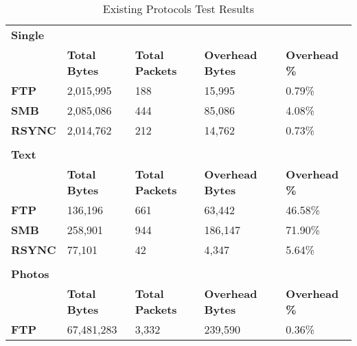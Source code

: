 \begin{table}[h!]
	\caption{Existing Protocols Test Results}
	\label{tab:existing-protocols-test-results}
	\centering
	\begin{tabular}{l l l l l}
		\textbf{Single}     &                      &                        &                         &                      \\
		\textbf{}           & \textbf{Total Bytes} & \textbf{Total Packets} & \textbf{Overhead Bytes} & \textbf{Overhead \%} \\
		\hline
		\textbf{FTP}        & 2,015,995            & 188                    & 15,995                  & 0.79\%               \\
		\hline
		\textbf{SMB}        & 2,085,086            & 444                    & 85,086                  & 4.08\%               \\
		\hline
		\textbf{RSYNC}      & 2,014,762            & 212                    & 14,762                  & 0.73\%               \\
		\hline
		                    &                      &                        &                         &                      \\
		\textbf{Text}       &                      &                        &                         &                      \\
		\textbf{}           & \textbf{Total Bytes} & \textbf{Total Packets} & \textbf{Overhead Bytes} & \textbf{Overhead \%} \\
		\hline
		\textbf{FTP}        & 136,196              & 661                    & 63,442                  & 46.58\%              \\
		\hline
		\textbf{SMB}        & 258,901              & 944                    & 186,147                 & 71.90\%              \\
		\hline
		\textbf{RSYNC}      & 77,101               & 42                     & 4,347                   & 5.64\%               \\
		\hline
		                    &                      &                        &                         &                      \\
		\textbf{Photos}     &                      &                        &                         &                      \\
		\textbf{}           & \textbf{Total Bytes} & \textbf{Total Packets} & \textbf{Overhead Bytes} & \textbf{Overhead \%} \\
		\hline
		\textbf{FTP}        & 67,481,283           & 3,332                  & 239,590                 & 0.36\%               \\

\end{tabular}
\end{table}
